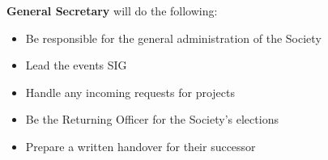 \begin{subclause}
  \textbf{General Secretary} will do the following:
  \begin{itemize}[label=--,topsep=0em,itemsep=0em]
    \item Be responsible for the general administration of the Society
    \item Lead the events SIG
    \item Handle any incoming requests for projects
    \item Be the Returning Officer for the Society's elections
    \item Prepare a written handover for their successor
  \end{itemize}
\end{subclause}
